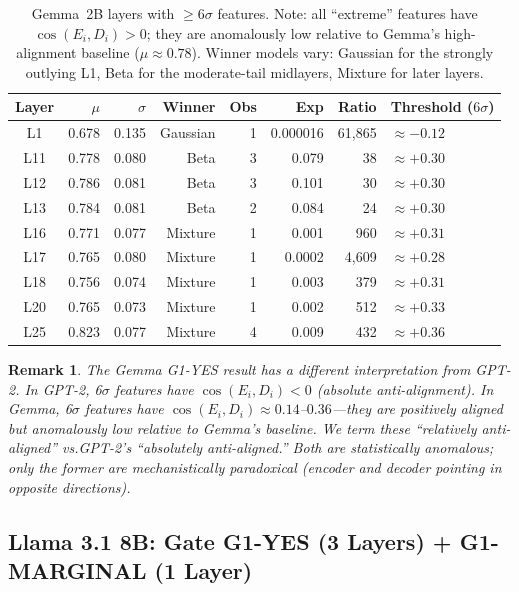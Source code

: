 \documentclass[11pt,a4paper]{article}
\newtheorem{remark}{Remark}
\newcommand{\cosED}{\cos(E_i, D_i)}
\begin{document}
\begin{table}[H]
\centering
\caption{Gemma~2B layers with $\geq 6\sigma$ features. Note: all ``extreme'' features have $\cosED > 0$; they are anomalously low relative to Gemma's high-alignment baseline ($\mu \approx 0.78$). Winner models vary: Gaussian for the strongly outlying L1, Beta for the moderate-tail midlayers, Mixture for later layers.}
\label{tab:gemma_g1}
\small
\begin{tabular}{@{}crrrrrrl@{}}
\toprule
Layer & $\mu$ & $\sigma$ & Winner & Obs & Exp & Ratio & Threshold ($6\sigma$) \\
\midrule
L1  & 0.678 & 0.135 & Gaussian & 1 & 0.000016 & 61,865 & $\approx{-0.12}$ \\
L11 & 0.778 & 0.080 & Beta & 3 & 0.079 & 38 & $\approx{+0.30}$ \\
L12 & 0.786 & 0.081 & Beta & 3 & 0.101 & 30 & $\approx{+0.30}$ \\
L13 & 0.784 & 0.081 & Beta & 2 & 0.084 & 24 & $\approx{+0.30}$ \\
L16 & 0.771 & 0.077 & Mixture & 1 & 0.001 & 960 & $\approx{+0.31}$ \\
L17 & 0.765 & 0.080 & Mixture & 1 & 0.0002 & 4,609 & $\approx{+0.28}$ \\
L18 & 0.756 & 0.074 & Mixture & 1 & 0.003 & 379 & $\approx{+0.31}$ \\
L20 & 0.765 & 0.073 & Mixture & 1 & 0.002 & 512 & $\approx{+0.33}$ \\
L25 & 0.823 & 0.077 & Mixture & 4 & 0.009 & 432 & $\approx{+0.36}$ \\
\bottomrule
\end{tabular}
\end{table}

\begin{remark}
The Gemma G1-YES result has a different interpretation from GPT-2. In GPT-2, 6$\sigma$ features have $\cosED < 0$ (absolute anti-alignment). In Gemma, 6$\sigma$ features have $\cosED \approx 0.14$--$0.36$---they are positively aligned but anomalously low relative to Gemma's baseline. We term these ``relatively anti-aligned'' vs.\@ GPT-2's ``absolutely anti-aligned.'' Both are statistically anomalous; only the former are mechanistically paradoxical (encoder and decoder pointing in opposite directions).
\end{remark}

\subsection{Llama 3.1 8B: Gate G1-YES (3 Layers) + G1-MARGINAL (1 Layer)}
\label{sec:llama}
\end{document}
